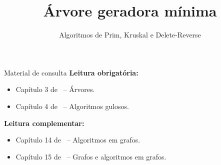 \newcommand{\templatesdir}{../../../templates}
\newcommand{\template}{template-slides-est}


\title[Árvore geradora mínima]{Árvore geradora mínima}
\subtitle{Algoritmos de Prim, Kruskal e Delete-Reverse}



\maketitle

\begin{frame}{Material de consulta}
	\textbf{Leitura obrigatória:}
	\begin{itemize}
		\item Capítulo 3 de~\cite{Goldbarg2AndGoldbarg2012} -- Árvores.
		\item Capítulo 4 de~\cite{KleinbergAndTardos2006} -- Algoritmos gulosos.
	\end{itemize}
	
	\bigskip
	
	\textbf{Leitura complementar:}
	\begin{itemize}
		\item Capítulo 14 de~\cite{GoodrichEtAl2014} -- Algoritmos em grafos.
		\item Capítulo 15 de~\cite{Preiss2001} -- Grafos e algoritmos em grafos.
	\end{itemize}
\end{frame}


